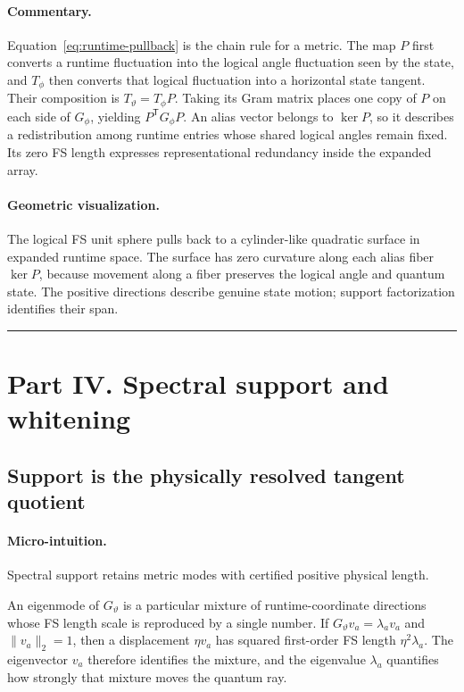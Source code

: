 \documentclass[10pt,twocolumn]{article}
\newcommand{\conceptbreak}{%
  \par\medskip\noindent
  {\color{black!30}\rule{\columnwidth}{0.35pt}}%
  \par\medskip}
\newcommand{\micro}{\paragraph{Micro-intuition.}}
\newcommand{\commentaryblock}{\paragraph{Commentary.}}
\newcommand{\geometryblock}{\paragraph{Geometric visualization.}}
\begin{document}
\commentaryblock Equation~\eqref{eq:runtime-pullback} is the chain rule for a
metric. The map \(P\) first converts a runtime fluctuation into the logical
angle fluctuation seen by the state, and \(T_\phi\) then converts that logical
fluctuation into a horizontal state tangent. Their composition is
\(T_\vartheta=T_\phi P\). Taking its Gram matrix places one copy of \(P\) on
each side of \(G_\phi\), yielding \(P^{\mathsf T}G_\phi P\). An alias vector
belongs to \(\ker P\), so it describes a redistribution among runtime entries
whose shared logical angles remain fixed. Its zero FS length expresses
representational redundancy inside the expanded array.

\geometryblock The logical FS unit sphere pulls back to a cylinder-like
quadratic surface in expanded runtime space. The surface has zero curvature
along each alias fiber \(\ker P\), because movement along a fiber preserves
the logical angle and quantum state. The positive directions describe genuine
state motion; support factorization identifies their span.

\begin{center}
\end{center}

\conceptbreak

\section*{Part IV. Spectral support and whitening}

\subsection*{Support is the physically resolved tangent quotient}

\micro Spectral support retains metric modes with certified positive physical
length.

An eigenmode of \(G_\vartheta\) is a particular mixture of runtime-coordinate
directions whose FS length scale is reproduced by a single number. If
\(G_\vartheta v_a=\lambda_av_a\) and \(\|v_a\|_2=1\), then a displacement
\(\eta v_a\) has squared first-order FS length
\(\eta^2\lambda_a\). The eigenvector \(v_a\) therefore identifies the mixture,
and the eigenvalue \(\lambda_a\) quantifies how strongly that mixture moves the
quantum ray.
\end{document}
